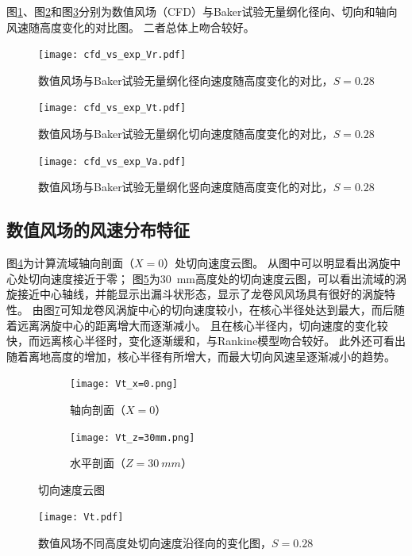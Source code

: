 图\ref{fig:cfd_vs_exp_Vr}、图\ref{fig:cfd_vs_exp_Vt}和图\ref{fig:cfd_vs_exp_Va}分别为数值风场（CFD）与Baker试验无量纲化径向、切向和轴向风速随高度变化的对比图。
二者总体上吻合较好。

\begin{figure}[!htbp]
  \centering
  \texttt{[image: cfd\_vs\_exp\_Vr.pdf]}
  \caption{数值风场与Baker试验无量纲化径向速度随高度变化的对比，$S=0.28$}
  \label{fig:cfd_vs_exp_Vr}
\end{figure}
\begin{figure}[!htbp]
  \centering
  \texttt{[image: cfd\_vs\_exp\_Vt.pdf]}
  \caption{数值风场与Baker试验无量纲化切向速度随高度变化的对比，$S=0.28$}
  \label{fig:cfd_vs_exp_Vt}
\end{figure}
\begin{figure}[!htbp]
  \centering
  \texttt{[image: cfd\_vs\_exp\_Va.pdf]}
  \caption{数值风场与Baker试验无量纲化竖向速度随高度变化的对比，$S=0.28$}
  \label{fig:cfd_vs_exp_Va}
\end{figure}

\subsection{数值风场的风速分布特征}
图\ref{fig:Vt-x=0}为计算流域轴向剖面（$X=0$）处切向速度云图。
从图中可以明显看出涡旋中心处切向速度接近于零；
图\ref{fig:Vt-z=30mm}为\SI{30}{mm}高度处的切向速度云图，可以看出流域的涡旋接近中心轴线，并能显示出漏斗状形态，显示了龙卷风风场具有很好的涡旋特性。
由图\ref{fig:Vt}可知龙卷风涡旋中心的切向速度较小，在核心半径处达到最大，而后随着远离涡旋中心的距离增大而逐渐减小。
且在核心半径内，切向速度的变化较快，而远离核心半径时，变化逐渐缓和，与Rankine模型吻合较好。
此外还可看出随着离地高度的增加，核心半径有所增大，而最大切向风速呈逐渐减小的趋势。
\begin{figure}[!htbp]
  \begin{subfigure}[b]{0.5\textwidth}
    \centering
    \texttt{[image: Vt\_x=0.png]}
    \caption{轴向剖面（$X=0$）}\label{fig:Vt-x=0}
  \end{subfigure}
  \begin{subfigure}[b]{0.5\textwidth}
    \centering
    \texttt{[image: Vt\_z=30mm.png]}
    \caption{水平剖面（$Z=\SI{30}{mm}$）}\label{fig:Vt-z=30mm}
  \end{subfigure}
  \caption{切向速度云图}\label{fig:Vt-contour}
\end{figure}

\begin{figure}
  \centering
  \texttt{[image: Vt.pdf]}
  \caption{数值风场不同高度处切向速度沿径向的变化图，$S=0.28$}
  \label{fig:Vt}
\end{figure}

